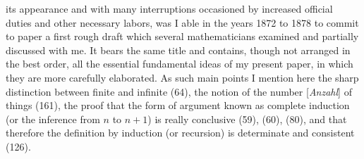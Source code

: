 \documentclass[oneside]{book}
\begin{document}
its appearance and with many interruptions occasioned
by increased official duties and other necessary
labors, was I able in the years 1872 to 1878 to commit
to paper a first rough draft which several mathematicians
examined and partially discussed with me. It
bears the same title and contains, though not arranged
in the best order, all the essential fundamental ideas
of my present paper, in which they are more carefully
elaborated. As such main points I mention here the
sharp distinction between finite and infinite (64), the
notion of the number [\textit{Anzahl}] of things (161), the
proof that the form of argument known as complete
induction (or the inference from $n$ to $n + 1$) is really
conclusive (59), (60), (80), and that therefore the
definition by induction (or recursion) is determinate
and consistent (126).
\end{document}
